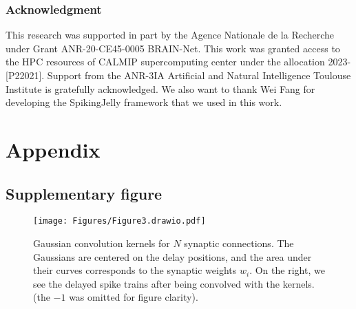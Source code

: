 \documentclass{article} \usepackage{iclr2024_conference,times}
\begin{document}
\begin{comment}
\subsubsection*{Limitations}
The primary limitations of our work revolve around the compatibility and constraints of our delay learning method. Specifically, our method is limited to offline training conducted in discrete-time simulations, and it cannot handle recurrent connections. Additionally, a maximum delay limit, which corresponds to the size of the kernel, must be predetermined and fixed before the learning process.

\subsubsection*{Computational resources}
This project required about 500 GPU hours on a single Nvidia Tesla T4 GPU with two Intel(R) Xeon(R) CPUs @ 2.20 GHz threads. Given this hardware configuration, a single training session lasted approximately 1 hour for the SHD runs, while for the SSC/GSC runs, a single training session lasted around 7 hours. The available computing resources allowed us to perform the required calculations efficiently, leading to accurate and competitive outcomes within a reasonable time.
\end{comment}

\subsubsection*{Acknowledgment}

This research was supported in part by the Agence Nationale de la Recherche under Grant ANR-20-CE45-0005 BRAIN-Net. This work was granted access to the HPC resources of CALMIP supercomputing center under the allocation 2023-[P22021]. Support from the ANR-3IA Artificial and Natural Intelligence Toulouse Institute is gratefully acknowledged. We also want to thank Wei Fang for developing the SpikingJelly framework that we used in this work.





\newpage
\appendix
\section{Appendix}
\subsection{Supplementary figure}
\begin{figure}[!ht]

  \centering
  \texttt{[image: Figures/Figure3.drawio.pdf]}
  \caption{Gaussian convolution kernels for $N$ synaptic connections. The Gaussians are centered on the delay positions, and the area under their curves corresponds to the synaptic weights $w_i$. On the right, we see the delayed spike trains after being convolved with the kernels. (the $-1$ was omitted for figure clarity).}
  \label{fig:methods_fig2}
\end{figure}
\end{document}
